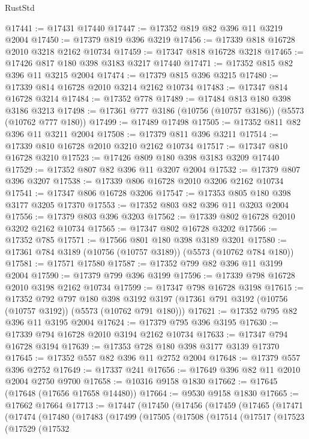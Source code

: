 \begin{lexlean}{RustStd}
\begin{coremodule}
@17441 := @17431 @17440
@17447 := @17352 @819 @82 @396 @11 @3219 @2004
@17450 := @17379 @819 @396 @3219
@17456 := @17339 @818 @16728 @2010 @3218 @2162 @10734
@17459 := @17347 @818 @16728 @3218
@17465 := @17426 @817 @180 @398 @3183 @3217 @17440
@17471 := @17352 @815 @82 @396 @11 @3215 @2004
@17474 := @17379 @815 @396 @3215
@17480 := @17339 @814 @16728 @2010 @3214 @2162 @10734
@17483 := @17347 @814 @16728 @3214
@17484 := @17352 @778
@17489 := @17484 @813 @180 @398 @3186 @3213
@17498 := @17361 @777 @3186 (@10756 (@10757 @3186)) (@5573 (@10762 @777 @180))
@17499 := @17489 @17498
@17505 := @17352 @811 @82 @396 @11 @3211 @2004
@17508 := @17379 @811 @396 @3211
@17514 := @17339 @810 @16728 @2010 @3210 @2162 @10734
@17517 := @17347 @810 @16728 @3210
@17523 := @17426 @809 @180 @398 @3183 @3209 @17440
@17529 := @17352 @807 @82 @396 @11 @3207 @2004
@17532 := @17379 @807 @396 @3207
@17538 := @17339 @806 @16728 @2010 @3206 @2162 @10734
@17541 := @17347 @806 @16728 @3206
@17547 := @17353 @805 @180 @398 @3177 @3205 @17370
@17553 := @17352 @803 @82 @396 @11 @3203 @2004
@17556 := @17379 @803 @396 @3203
@17562 := @17339 @802 @16728 @2010 @3202 @2162 @10734
@17565 := @17347 @802 @16728 @3202
@17566 := @17352 @785
@17571 := @17566 @801 @180 @398 @3189 @3201
@17580 := @17361 @784 @3189 (@10756 (@10757 @3189)) (@5573 (@10762 @784 @180))
@17581 := @17571 @17580
@17587 := @17352 @799 @82 @396 @11 @3199 @2004
@17590 := @17379 @799 @396 @3199
@17596 := @17339 @798 @16728 @2010 @3198 @2162 @10734
@17599 := @17347 @798 @16728 @3198
@17615 := @17352
    @792
    @797
    @180
    @398
    @3192
    @3197
    (@17361 @791 @3192 (@10756 (@10757 @3192)) (@5573 (@10762 @791 @180)))
@17621 := @17352 @795 @82 @396 @11 @3195 @2004
@17624 := @17379 @795 @396 @3195
@17630 := @17339 @794 @16728 @2010 @3194 @2162 @10734
@17633 := @17347 @794 @16728 @3194
@17639 := @17353 @728 @180 @398 @3177 @3139 @17370
@17645 := @17352 @557 @82 @396 @11 @2752 @2004
@17648 := @17379 @557 @396 @2752
@17649 := @17337 @241
@17656 := @17649 @396 @82 @11 @2010 @2004 @2750 @9700
@17658 := @10316 @9158 @1830
@17662 := @17645 (@17648 (@17656 @17658 @14480))
@17664 := @9530 @9158 @1830
@17665 := @17662 @17664
@17713 := @17447
    (@17450
      (@17456
        (@17459
          (@17465
            (@17471
              (@17474
                (@17480
                  (@17483
                    (@17499
                      (@17505
                        (@17508
                          (@17514
                            (@17517
                              (@17523
                                (@17529
                                  (@17532

\end{coremodule}
\end{lexlean}
